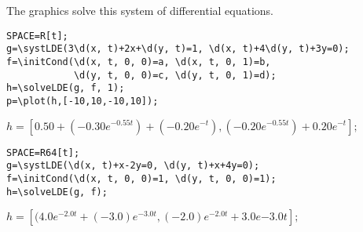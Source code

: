 The graphics solve this system of differential equations.

\begin{verbatim}
SPACE=R[t];
g=\systLDE(3\d(x, t)+2x+\d(y, t)=1, \d(x, t)+4\d(y, t)+3y=0);
f=\initCond(\d(x, t, 0, 0)=a, \d(x, t, 0, 1)=b, 
            \d(y, t, 0, 0)=c, \d(y, t, 0, 1)=d);
h=\solveLDE(g, f, 1); 
p=\plot(h,[-10,10,-10,10]); 
\end{verbatim}


{$h = [0. 50+(-0. 30 e^{-0. 55t})+(-0. 20 e^{-t}), (-0. 20 e^{-0. 55t})+0. 20 e^{-t}];$}

\begin{verbatim}
SPACE=R64[t];
g=\systLDE(\d(x, t)+x-2y=0, \d(y, t)+x+4y=0);
f=\initCond(\d(x, t, 0, 0)=1, \d(y, t, 0, 0)=1);
h=\solveLDE(g, f);  
\end{verbatim}

{$h = [(4.0 e^{-2.0t}+(-3.0) e^{-3.0t}, (-2.0) e^{-2.0t}+3.0 e{-3.0t}];$}

